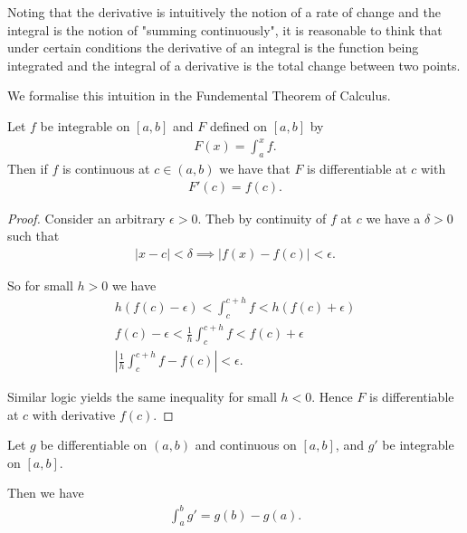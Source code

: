 \documentclass[]{article}
\begin{document}
Noting that the derivative is intuitively the notion of a rate of change and the integral is the notion of "summing continuously", it is reasonable to think that under certain conditions the derivative of an integral is the function being integrated and the integral of a derivative is the total change between two points.

We formalise this intuition in the Fundemental Theorem of Calculus.

\begin{thm} 
		Let $f$ be integrable on $[a,b]$ and $F$ defined on $[a,b]$ by
		\begin{align*}
				F(x) = \int_a^xf.
		\end{align*}
		Then if $f$ is continuous at $c \in (a,b)$ we have that $F$ is differentiable at $c$ with
		\begin{align*}
				F'(c) = f(c).
		\end{align*}
\end{thm} 

\begin{proof}
		Consider an arbitrary $\epsilon > 0$. Theb by continuity of $f$ at $c$ we have a $\delta > 0$ such that
		\begin{align*}
				|x - c| < \delta \implies |f(x) - f(c)| < \epsilon.
		\end{align*}

		So for small $h > 0$ we have 
		\begin{align*}
				h(f(c) - \epsilon) < \int_c^{c+h}f < h(f(c) + \epsilon) \\
				f(c) - \epsilon < \frac{1}{h}\int_c^{c+h}f < f(c) + \epsilon \\
				\left|\frac{1}{h}\int_c^{c+h}f - f(c)\right| < \epsilon.
		\end{align*}

		Similar logic yields the same inequality for small $h<0$. Hence $F$ is differentiable at $c$ with derivative $f(c)$.
\end{proof}

\begin{thm} 
		Let $g$ be differentiable on $(a,b)$ and continuous on $[a,b]$, and $g'$ be integrable on $[a,b]$.

		Then we have
		\begin{align*}
				\int_a^b g' = g(b) - g(a).
		\end{align*}
\end{thm}
\end{document}
